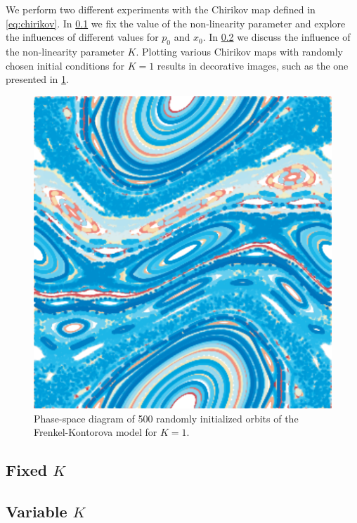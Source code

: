 
We perform two different experiments with the Chirikov map defined in \cref{eq:chirikov}. In \cref{ss:fixed} we fix the value of the non-linearity parameter and explore the influences of different values for $p_0$ and $x_0$. In \cref{ss:variable} we discuss the influence of the non-linearity parameter $K$. Plotting various Chirikov maps with randomly chosen initial conditions for $K = 1$ results in decorative images, such as the one presented in \cref{fig:a:pretty}.

	\begin{figure}[b]
		\centering
		\includegraphics[width=0.9\columnwidth]{./img/assignment_a_pretty_low_res.pdf}
		\caption{Phase-space diagram of 500 randomly initialized orbits of the Frenkel-Kontorova model for $K = 1$.}
		\label{fig:a:pretty}
	\end{figure}

\subsection[]{Fixed $K$}
\label{ss:fixed}


\subsection[]{Variable $K$}
\label{ss:variable}
